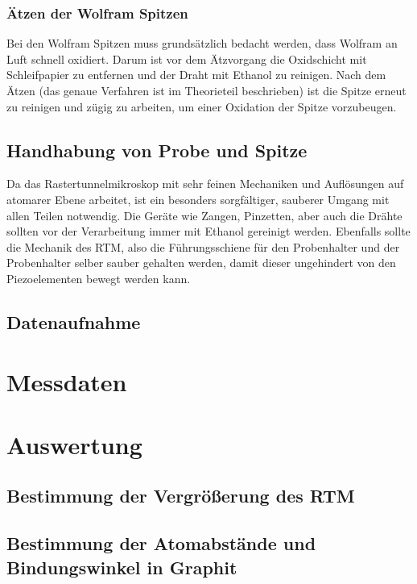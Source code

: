 \documentclass[10pt, a4paper]{article}
\begin{document}
\subsubsection{Ätzen der Wolfram Spitzen}

Bei den Wolfram Spitzen muss grundsätzlich bedacht werden, dass Wolfram an Luft schnell oxidiert. 
Darum ist vor dem Ätzvorgang die Oxidschicht mit Schleifpapier zu entfernen und  der Draht mit Ethanol zu reinigen.
Nach dem Ätzen (das genaue Verfahren ist im Theorieteil beschrieben) ist die Spitze erneut zu reinigen und zügig zu arbeiten, um einer Oxidation der Spitze vorzubeugen.

\subsection{Handhabung von Probe und Spitze}


Da das Rastertunnelmikroskop mit sehr feinen Mechaniken und Auflösungen auf atomarer Ebene arbeitet, ist ein besonders sorgfältiger, sauberer Umgang mit allen Teilen notwendig.
Die Geräte wie Zangen, Pinzetten, aber auch die Drähte sollten vor der Verarbeitung immer mit Ethanol gereinigt werden.
Ebenfalls sollte die Mechanik des RTM, also die Führungsschiene für den Probenhalter und der Probenhalter selber sauber gehalten werden, damit dieser ungehindert von den Piezoelementen bewegt werden kann.

\subsection{Datenaufnahme}

\section{Messdaten}


\section{Auswertung}

\subsection{Bestimmung der Vergrößerung des RTM}

\subsection{Bestimmung der Atomabstände und Bindungswinkel in Graphit}
\end{document}
